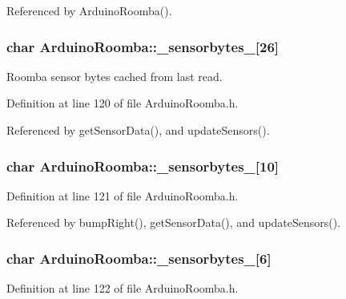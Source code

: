 Referenced by ArduinoRoomba().

\hypertarget{class_arduino_roomba_ad0429e4cb07918eb89532605d5062b03}{
\subsubsection[{\_\-sensorbytes\_\-0}]{\setlength{\rightskip}{0pt plus 5cm}char {\bf ArduinoRoomba::\_\-sensorbytes\_}\mbox{[}26\mbox{]}}}
\label{class_arduino_roomba_ad0429e4cb07918eb89532605d5062b03}


Roomba sensor bytes cached from last read. 



Definition at line 120 of file ArduinoRoomba.h.



Referenced by getSensorData(), and updateSensors().

\hypertarget{class_arduino_roomba_a693f180d190aa31257d5bf5d1766aec1}{
\subsubsection[{\_\-sensorbytes\_\-1}]{\setlength{\rightskip}{0pt plus 5cm}char {\bf ArduinoRoomba::\_\-sensorbytes\_}\mbox{[}10\mbox{]}}}
\label{class_arduino_roomba_a693f180d190aa31257d5bf5d1766aec1}


Definition at line 121 of file ArduinoRoomba.h.



Referenced by bumpRight(), getSensorData(), and updateSensors().

\hypertarget{class_arduino_roomba_a4ea894f4c1b9c7d976b2fdd19482ae26}{
\subsubsection[{\_\-sensorbytes\_\-2}]{\setlength{\rightskip}{0pt plus 5cm}char {\bf ArduinoRoomba::\_\-sensorbytes\_}\mbox{[}6\mbox{]}}}
\label{class_arduino_roomba_a4ea894f4c1b9c7d976b2fdd19482ae26}


Definition at line 122 of file ArduinoRoomba.h.



